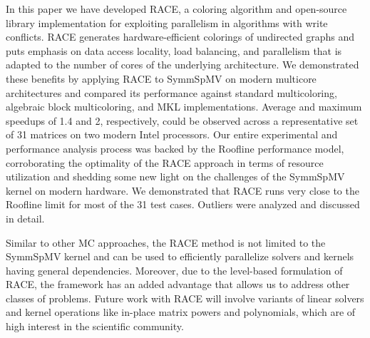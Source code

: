 In this paper we have developed \acrshort{RACE}, a coloring algorithm and open-source library
implementation for exploiting parallelism in algorithms with write conflicts.
\acrshort{RACE} generates hardware-efficient \DK colorings of undirected graphs and puts 
emphasis on data access locality, load balancing, and 
parallelism that is adapted to the number of cores of the underlying architecture.  We
demonstrated these benefits by applying \acrshort{RACE} to \acrfull{SymmSpMV} on modern
multicore architectures and compared its performance against
standard multicoloring, algebraic block multicoloring, and \acrshort{MKL}
implementations. Average and maximum speedups of 1.4 and 2, respectively,
could be observed across a representative set of 31 matrices on
two modern Intel processors. 
Our entire experimental and performance analysis process was backed by the
Roof{}line performance model, corroborating the optimality of
the \acrshort{RACE} approach in terms of resource utilization and shedding some new
light on the challenges of the \acrshort{SymmSpMV} kernel on modern hardware.
We demonstrated that \acrshort{RACE} runs very close to the Roof{}line limit for
most of the 31 test cases. Outliers were analyzed and discussed in detail.

Similar to other \acrshort{MC} approaches, the \acrshort{RACE} method is not
limited to the \acrshort{SymmSpMV} kernel and can be used to efficiently
parallelize solvers and kernels having general \DK dependencies. Moreover, due
to the level-based formulation of \acrshort{RACE}, the framework has an added
advantage that allows us to address other classes of problems. Future work
with \acrshort{RACE} will involve variants of linear solvers and kernel
operations like in-place matrix powers and polynomials, which are of high
interest in the scientific community.



